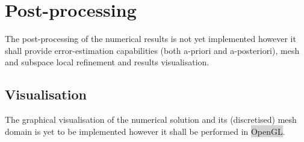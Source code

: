 \documentclass[11pt]{article}
\begin{document}
\section{Post-processing}
\noindent
The post-processing of the numerical results is not yet implemented however it shall provide error-estimation capabilities (both a-priori and a-posteriori), mesh and subspace local refinement and results visualisation.

\subsection{Visualisation}
The graphical visualisation of the numerical solution and its (discretised) mesh domain is yet to be implemented however it shall be performed in \colorbox{lightgray}{OpenGL}.

\newpage


\end{document}
